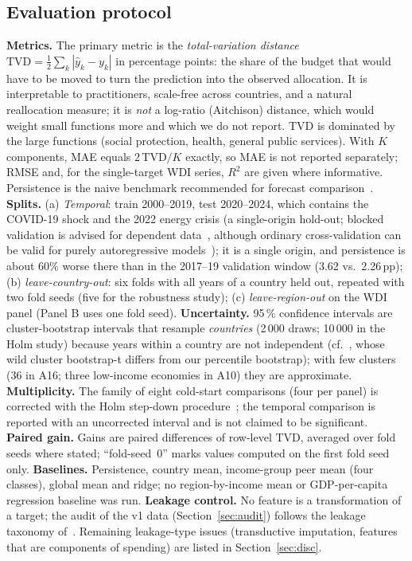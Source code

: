 \subsection{Evaluation protocol}
\textbf{Metrics.} The primary metric is the \emph{total-variation distance} $\mathrm{TVD}=\tfrac12\sum_k|\hat y_k-y_k|$ in percentage points: the share of the budget that would have to be moved to turn the prediction into the observed allocation. It is interpretable to practitioners, scale-free across countries, and a natural reallocation measure; it is \emph{not} a log-ratio (Aitchison) distance, which would weight small functions more and which we do not report. TVD is dominated by the large functions (social protection, health, general public services). With $K$ components, MAE equals $2\,\mathrm{TVD}/K$ exactly, so MAE is not reported separately; RMSE and, for the single-target WDI series, $R^2$ are given where informative. Persistence is the naive benchmark recommended for forecast comparison~\cite{hyndman2006}. \textbf{Splits.} (a) \emph{Temporal}: train 2000--2019, test 2020--2024, which contains the COVID-19 shock and the 2022 energy crisis (a single-origin hold-out; blocked validation is advised for dependent data~\cite{roberts2017}, although ordinary cross-validation can be valid for purely autoregressive models~\cite{bergmeir2018}); it is a single origin, and persistence is about 60\% worse there than in the 2017--19 validation window (3.62 vs.\ 2.26\,pp); (b) \emph{leave-country-out}: six folds with all years of a country held out, repeated with two fold seeds (five for the robustness study); (c) \emph{leave-region-out} on the WDI panel (Panel B uses one fold seed). \textbf{Uncertainty.} 95\,\% confidence intervals are cluster-bootstrap intervals that resample \emph{countries} (2\,000 draws; 10\,000 in the Holm study) because years within a country are not independent (cf.~\cite{cameron2008}, whose wild cluster bootstrap-t differs from our percentile bootstrap); with few clusters (36 in A16; three low-income economies in A10) they are approximate. \textbf{Multiplicity.} The family of eight cold-start comparisons (four per panel) is corrected with the Holm step-down procedure~\cite{holm1979}; the temporal comparison is reported with an uncorrected interval and is not claimed to be significant. \textbf{Paired gain.} Gains are paired differences of row-level TVD, averaged over fold seeds where stated; ``fold-seed~0'' marks values computed on the first fold seed only. \textbf{Baselines.} Persistence, country mean, income-group peer mean (four classes), global mean and ridge; no region-by-income mean or GDP-per-capita regression baseline was run. \textbf{Leakage control.} No feature is a transformation of a target; the audit of the v1 data (Section~\ref{sec:audit}) follows the leakage taxonomy of~\cite{kaufman2012}. Remaining leakage-type issues (transductive imputation, features that are components of spending) are listed in Section~\ref{sec:disc}.


